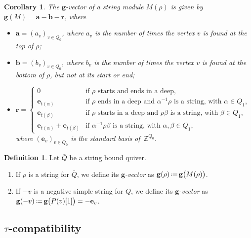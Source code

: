 \documentclass{amsart}
\newtheorem{corollary}[theorem]{Corollary}
\theoremstyle{definition}
\newtheorem{definition}[theorem]{Definition}
\newcommand{\Z}{\mathbb{Z}} %
\renewcommand{\b}[1]{\mathbf{#1}} %
\newcommand{\eqdef}{\mbox{\,\raisebox{0.2ex}{\scriptsize\ensuremath{\mathrm:}}\ensuremath{=}\,}} %
\newcommand{\darkblue}{\color{darkblue}} %
\newcommand{\defn}[1]{\textsl{\darkblue #1}} %
\begin{document}
\begin{corollary}
 The $\b{g}$-vector of a string module $M(\rho)$ is given by $\b{g}(M) = \b{a} - \b{b} - \b{r}$, where
 \begin{itemize}
  \item $\b{a} = (a_v)_{v\in Q_0}$, where $a_v$ is the number of times the vertex $v$ is found at the top of $\rho$;
  \item $\b{b} = (b_v)_{v\in Q_0}$, where $b_v$ is the number of times the vertex $v$ is found at the bottom of $\rho$,
        but not at its start or end;
        \medskip
  \item 
  		\(
         \b{r} = \begin{cases}
                   0 & \textrm{if $\rho$ starts and ends in a deep,} \\
                   \b{e}_{t(\alpha)}   & \textrm{if $\rho$ ends in a deep and $\alpha^{-1}\rho$ is a string, with $\alpha\in Q_1$,} \\
                   \b{e}_{t(\beta)}    & \textrm{if $\rho$ starts in a deep and $\rho\beta$ is a string, with $\beta\in Q_1$,} \\
                   \b{e}_{t(\alpha)} + \b{e}_{t(\beta)}  & \textrm{if $\alpha^{-1}\rho\beta$ is a string, with $\alpha, \beta\in Q_1$,}
                  \end{cases}
        \) \\
        \medskip
        where $(\b{e}_v)_{v \in Q_0}$ is the standard basis of~$\Z^{Q_0}$.
 \end{itemize}
\end{corollary}

\begin{definition}
Let $\bar Q$ be a string bound quiver.
\begin{enumerate}
  \item If $\rho$ is a string for $\bar Q$, we define its \defn{$\b{g}$-vector} as $\b{g}(\rho) \eqdef \b{g} \big( M(\rho) \big)$.
  \item If $-v$ is a negative simple string for $\bar Q$, we define its \defn{$\b{g}$-vector} as $\b{g}(-v) \eqdef \b{g} \big( P(v)[1] \big) = -\b{e}_v$.
\end{enumerate}
\end{definition}

\subsection{$\tau$-compatibility}
\label{subsec:compatibility}
\end{document}
